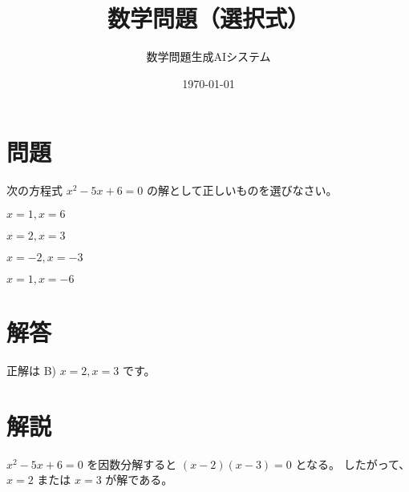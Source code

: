 \documentclass[a4paper,11pt]{article}
\title{数学問題（選択式）}
\author{数学問題生成AIシステム}
\date{\today}
\newcommand{\choice}[2]{
    \item[#1)] #2
}
\begin{document}
\maketitle

\section*{問題}

次の方程式 $x^2 - 5x + 6 = 0$ の解として正しいものを選びなさい。

\begin{description}[labelwidth=1cm, leftmargin=!]
\choice{A}{$x = 1, x = 6$}
\choice{B}{$x = 2, x = 3$}
\choice{C}{$x = -2, x = -3$}
\choice{D}{$x = 1, x = -6$}
\end{description}

\section*{解答}

正解は B) $x = 2, x = 3$ です。

\section*{解説}

$x^2 - 5x + 6 = 0$ を因数分解すると $(x - 2)(x - 3) = 0$ となる。
したがって、$x = 2$ または $x = 3$ が解である。

\end{document}
